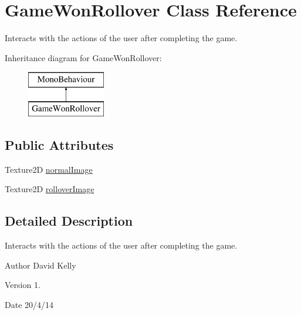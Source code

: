 \hypertarget{class_game_won_rollover}{\section{Game\-Won\-Rollover Class Reference}
\label{class_game_won_rollover}
}


Interacts with the actions of the user after completing the game.  


Inheritance diagram for Game\-Won\-Rollover\-:\begin{figure}[H]
\begin{center}
\leavevmode
\includegraphics[height=2.000000cm]{class_game_won_rollover}
\end{center}
\end{figure}
\subsection*{Public Attributes}
\begin{DoxyCompactItemize}
\item 
Texture2\-D \hyperlink{class_game_won_rollover_a34f70647ed3d11b473719789f3a70d17}{normal\-Image}
\item 
Texture2\-D \hyperlink{class_game_won_rollover_a8fdd8cbd840e471566a0731f80e96a57}{rollover\-Image}
\end{DoxyCompactItemize}


\subsection{Detailed Description}
Interacts with the actions of the user after completing the game. 

\begin{DoxyAuthor}{Author}
David Kelly 
\end{DoxyAuthor}
\begin{DoxyVersion}{Version}
1. 
\end{DoxyVersion}
\begin{DoxyDate}{Date}
20/4/14 
\end{DoxyDate}


